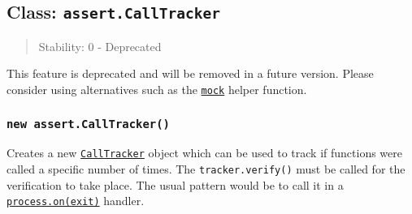 \subsection{\texorpdfstring{Class:
\texttt{assert.CallTracker}}{Class: assert.CallTracker}}\label{class-assert.calltracker}

\begin{quote}
Stability: 0 - Deprecated
\end{quote}

This feature is deprecated and will be removed in a future version.
Please consider using alternatives such as the
\href{test.md\#mocking}{\texttt{mock}} helper function.

\subsubsection{\texorpdfstring{\texttt{new\ assert.CallTracker()}}{new assert.CallTracker()}}\label{new-assert.calltracker}

Creates a new \hyperref[class-assertcalltracker]{\texttt{CallTracker}}
object which can be used to track if functions were called a specific
number of times. The \texttt{tracker.verify()} must be called for the
verification to take place. The usual pattern would be to call it in a
\href{process.md\#event-exit}{\texttt{process.on(\textquotesingle{}exit\textquotesingle{})}}
handler.

\begin{Shaded}
\begin{Highlighting}[]
 \OperatorTok{;}
   \OperatorTok{;}

\OperatorTok{=} \NormalTok{()}\OperatorTok{;}

 \NormalTok{() \{\}}

\OperatorTok{=}\OperatorTok{,} \NormalTok{)}\OperatorTok{;}

\NormalTok{()}\OperatorTok{;}

\NormalTok{(}\OperatorTok{,}\NormalTok{ () }\KeywordTok{=\textgreater{}}\NormalTok{ \{}
\NormalTok{()}\OperatorTok{;}
\NormalTok{\})}\OperatorTok{;}
\end{Highlighting}
\end{Shaded}

